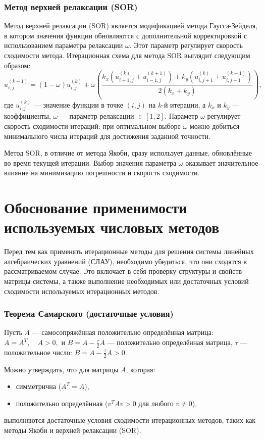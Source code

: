 \documentclass[a4paper, fleqn]{report}
\begin{document}
\subsection*{Метод верхней релаксации (SOR)}
Метод верхней релаксации (SOR) является модификацией метода Гаусса-Зейделя, в котором значения функции обновляются с дополнительной корректировкой с использованием параметра релаксации \( \omega \). Этот параметр регулирует скорость сходимости метода. Итерационная схема для метода SOR выглядит следующим образом:
\[
u_{i,j}^{(k+1)} = (1 - \omega) u_{i,j}^{(k)} + \omega \left( \frac{k_x (u_{i+1,j}^{(k)} + u_{i-1,j}^{(k+1)}) + k_y (u_{i,j+1}^{(k)} + u_{i,j-1}^{(k+1)})}{2(k_x + k_y)} \right),
\]
где \( u_{i,j}^{(k)} \) — значение функции в точке \((i, j)\) на \( k \)-й итерации, а \( k_x \) и \( k_y \) — коэффициенты, \( \omega \) — параметр релаксации \( \in [1, 2] \). Параметр \( \omega \) регулирует скорость сходимости итераций: при оптимальном выборе \( \omega \) можно добиться минимального числа итераций для достижения заданной точности.

Метод SOR, в отличие от метода Якоби, сразу использует данные, обновлённые во время текущей итерации. Выбор значения параметра \( \omega \) оказывает значительное влияние на минимизацию погрешности и скорость сходимости.


\chapter{Обоснование применимости используемых числовых методов}

Перед тем как применять итерационные методы для решения системы линейных алгебраических уравнений (СЛАУ), необходимо убедиться, что они сходятся в рассматриваемом случае. Это включает в себя проверку структуры и свойств матрицы системы, а также выполнение необходимых или достаточных условий сходимости используемых итерационных методов.

\subsection*{Теорема Самарского (достаточные условия)}
Пусть $A$ — самосопряжённая положительно определённая матрица:  
$A = A^T, \quad A > 0,$  
и $B = A - \frac{\tau}{2} A$ — положительно определённая матрица, $\tau$ — положительное число:  
$B = A - \frac{\tau}{2} A > 0.$

Можно утверждать, что для матрицы $A$, которая:
\begin{itemize}
    \item симметрична ($A^T = A$),
    \item положительно определённая ($v^T A v > 0$ для любого $v \neq 0$),
\end{itemize}
выполняются достаточные условия сходимости итерационных методов, таких как методы Якоби и верхней релаксации (SOR). 
\end{document}
